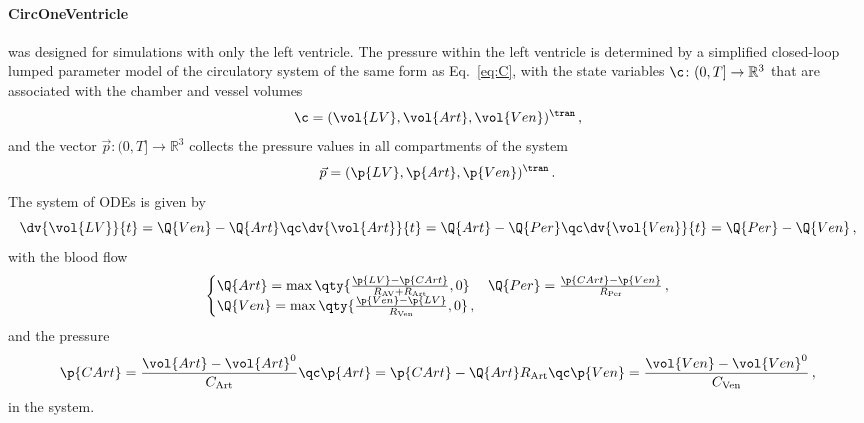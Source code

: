 \paragraph{CircOneVentricle} was designed for simulations with only the left ventricle.
The pressure within the left ventricle is determined by a simplified closed-loop lumped parameter model of the circulatory system of the same form as Eq.~\eqref{eq:C}, with the state variables $\c\colon(0,T]\rightarrow\mathbb{R}^{3}$ that are associated with the chamber and vessel volumes
\begin{equation}
    \c = (\vol{LV}, \vol{Art}, \vol{Ven})^\tran \,, \label{eq:lv:circ1}
\end{equation}
and the vector $\vec p\colon(0,T]\rightarrow\mathbb{R}^{3}$ collects the pressure values in all compartments of the system
\begin{equation}
    \vec p = (\p{LV}, \p{Art}, \p{Ven})^\tran \,.
\end{equation}
The system of ODEs is given by
\begin{equation}
    \dv{\vol{LV}}{t} = \Q{Ven} - \Q{Art} \qc
    \dv{\vol{Art}}{t} = \Q{Art} - \Q{Per} \qc
    \dv{\vol{Ven}}{t} = \Q{Per} - \Q{Ven} \,,
\end{equation}
with the blood flow 
\begin{equation}
\begin{cases}
    \Q{Art} = \max \qty{ \frac{\p{LV}-\p{CArt}}{R_\text{AV} + R_\text{Art}},0} & 
    \Q{Per} = \frac{\p{CArt} - \p{Ven}}{R_\text{Per}} \,,\\
    \Q{Ven} = \max \qty{\frac{\p{Ven} - \p{LV}}{R_\text{Ven}},0} \,, & \\
\end{cases}
\end{equation}
and the pressure
\begin{equation}
    \p{CArt} = \frac{\vol{Art}-\vol{Art}^0}{C_\mathrm{Art}} \qc
    \p{Art} = \p{CArt} - \Q{Art}R_\text{Art} \qc
    \p{Ven} = \frac{\vol{Ven}-\vol{Ven}^0}{C_\mathrm{Ven}} \,,  \label{eq:lv:circ2}
\end{equation}
in the system.

